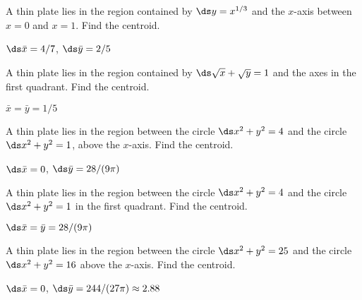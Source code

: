 \begin{exercises}

\begin{exercise} A thin plate lies in the region contained by $\ds y=x^{1/3}$ and
the $x$-axis between $x=0$ and $x=1$. Find the centroid.
\begin{answer} $\ds \bar x=4/7$, $\ds \bar y=2/5$
\end{answer}\end{exercise}

\begin{exercise} A thin plate lies in the region contained by 
$\ds \sqrt{x}+\sqrt{y}=1$ and the axes in the first quadrant.
Find the centroid.
\begin{answer} $\bar x=\bar y=1/5$
\end{answer}\end{exercise}

\begin{exercise} A thin plate lies in the region between
the circle $\ds x^2+y^2=4$ and the circle $\ds x^2+y^2=1$, above the $x$-axis.
Find the centroid.
\begin{answer} $\ds \bar x=0$, $\ds \bar y=28/(9\pi)$
\end{answer}\end{exercise}

\begin{exercise} A thin plate lies in the region between 
the circle $\ds x^2+y^2=4$ and the circle $\ds x^2+y^2=1$ in the first quadrant.
Find the centroid.
\begin{answer} $\ds \bar x=\bar y=28/(9\pi)$
\end{answer}\end{exercise}

\begin{exercise} A thin plate lies in the region between 
the circle $\ds x^2+y^2=25$ and the circle $\ds x^2+y^2=16$
above the $x$-axis.
Find the centroid.
\begin{answer} $\ds \bar x=0$, $\ds\bar y=244/(27\pi)\approx 2.88$
\end{answer}\end{exercise}

\end{exercises}
